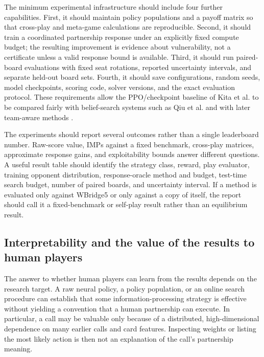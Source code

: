 \documentclass[11pt]{article}
\begin{document}
The minimum experimental infrastructure should include four further capabilities. First, it should maintain policy populations and a payoff matrix so that cross-play and meta-game calculations are reproducible. Second, it should train a coordinated partnership response under an explicitly fixed compute budget; the resulting improvement is evidence about vulnerability, not a certificate unless a valid response bound is available. Third, it should run paired-board evaluations with fixed seat rotations, reported uncertainty intervals, and separate held-out board sets. Fourth, it should save configurations, random seeds, model checkpoints, scoring code, solver versions, and the exact evaluation protocol. These requirements allow the PPO/checkpoint baseline of Kita et al. to be compared fairly with belief-search systems such as Qiu et al. and with later team-aware methods \cite{kita2024simple,qiu2024bridge}.

The experiments should report several outcomes rather than a single leaderboard number. Raw-score value, IMPs against a fixed benchmark, cross-play matrices, approximate response gains, and exploitability bounds answer different questions. A useful result table should identify the strategy class, reward, play evaluator, training opponent distribution, response-oracle method and budget, test-time search budget, number of paired boards, and uncertainty interval. If a method is evaluated only against WBridge5 or only against a copy of itself, the report should call it a fixed-benchmark or self-play result rather than an equilibrium result.

\subsection{Interpretability and the value of the results to human players}

The answer to whether human players can learn from the results depends on the research target. A raw neural policy, a policy population, or an online search procedure can establish that some information-processing strategy is effective without yielding a convention that a human partnership can execute. In particular, a call may be valuable only because of a distributed, high-dimensional dependence on many earlier calls and card features. Inspecting weights or listing the most likely action is then not an explanation of the call's partnership meaning.
\end{document}
